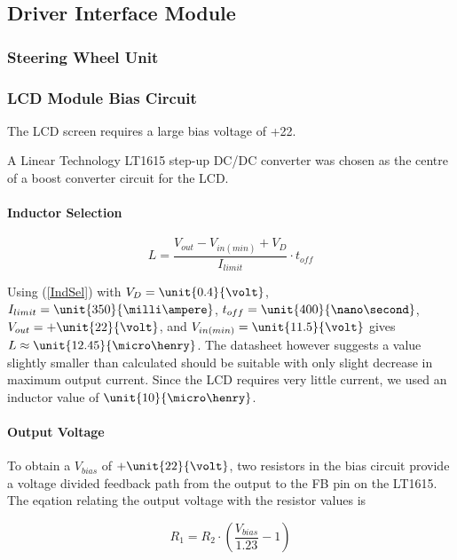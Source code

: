 \subsection{Driver Interface Module}


\subsubsection{Steering Wheel Unit}


\subsubsection{LCD Module Bias Circuit}

The LCD screen requires a large bias voltage of +\unit{22}{\volt}.

A Linear Technology LT1615 step-up DC/DC converter was chosen as the centre of a boost converter circuit for the LCD.


\paragraph{Inductor Selection}

\begin{equation}
L=\frac{V_{out}-V_{in(min)}+V_{D}}{I_{limit}}\cdot t_{off}\label{IndSel}
\end{equation}


Using (\ref{IndSel}) with $V_{D}=\unit{0.4}{\volt}$, $I_{limit}=\unit{350}{\milli\ampere}$, $t_{off}=\unit{400}{\nano\second}$, $V_{out}=+\unit{22}{\volt}$, and $V_{in(min)}=\unit{11.5}{\volt}$ gives $L\approx\unit{12.45}{\micro\henry}$. The datasheet however suggests a value slightly smaller than calculated should be suitable with only slight decrease in maximum output current. Since the LCD requires very little current, we used an inductor value of $\unit{10}{\micro\henry}$.


\paragraph{Output Voltage}

To obtain a $V_{bias}$ of $+\unit{22}{\volt}$, two resistors in the bias circuit provide a voltage divided feedback path from the output to the FB pin on the LT1615. The eqation relating the output voltage with the resistor values is

\begin{equation}
R_{1}=R_{2}\cdot\left(\frac{V_{bias}}{1.23}-1\right)
\end{equation}

